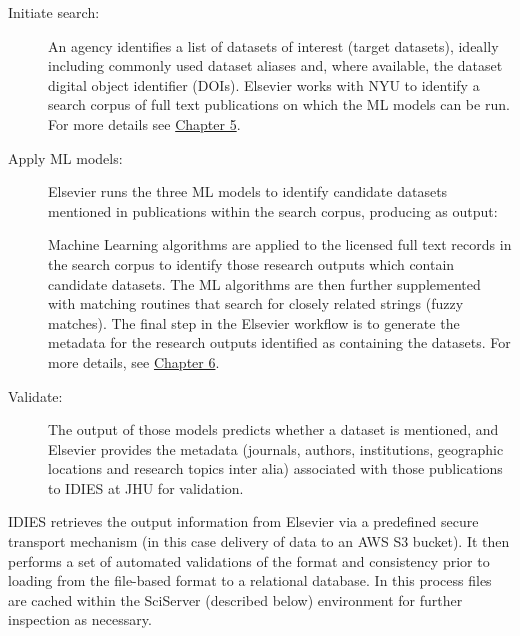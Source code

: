 \documentclass[titlepage, 11pt]{article}
\begin{document}
{\begin{description}
\item [Initiate search:] An agency identifies a list of datasets of interest (target datasets), ideally including commonly used dataset aliases and, where available, the dataset digital object identifier (DOIs).  Elsevier works with NYU to identify a search corpus of full text publications on which the ML models can be run.  For more details see \hyperref[sec:Chapter5]{Chapter 5}.


\item [Apply ML models:] Elsevier runs the three ML models to identify candidate datasets mentioned in publications within the search corpus, producing as output: Machine Learning algorithms are applied to the licensed full text records in the search corpus to identify those research outputs which contain candidate datasets. The ML algorithms are then further supplemented with matching routines that search for closely related strings (fuzzy matches). The final step in the Elsevier workflow is to generate the metadata for the research outputs identified as containing the datasets. For more details, see \hyperref[sec:Chapter6]{Chapter 6}. 

\item [Validate:] The output of those models predicts whether a dataset is mentioned, and Elsevier provides the metadata (journals, authors, institutions, geographic locations and research topics inter alia) associated with those publications to IDIES at JHU for validation. 

\end{description}
IDIES retrieves the output information from Elsevier via a predefined secure transport mechanism (in this case delivery of data to an AWS S3 bucket). It then performs a set of automated validations of the format and consistency prior to loading from the file-based format to a relational database. In this process files are cached within the SciServer (described below) environment for further inspection as necessary.

}
\end{document}

